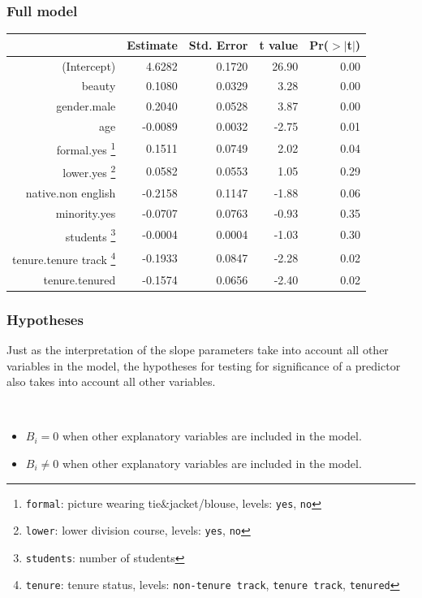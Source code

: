 
\begin{frame}[fragile]
\frametitle{Full model}

{\small
\begin{center}
\begin{tabular}{rrrrr}
  \hline
 & Estimate & Std. Error & t value & Pr($>$$|$t$|$) \\ 
  \hline
(Intercept) & 4.6282 & 0.1720 & 26.90 & 0.00 \\ 
  beauty & 0.1080 & 0.0329 & 3.28 & 0.00 \\ 
  gender.male & 0.2040 & 0.0528 & 3.87 & 0.00 \\ 
  age & -0.0089 & 0.0032 & -2.75 & 0.01 \\ 
formal.yes \footnote{\texttt{formal}: picture wearing tie\&jacket/blouse, levels: \texttt{yes}, \texttt{no}} & 0.1511 & 0.0749 & 2.02 & 0.04 \\ 
  lower.yes \footnote{\texttt{lower}: lower division course, levels: \texttt{yes}, \texttt{no}} & 0.0582 & 0.0553 & 1.05 & 0.29 \\ 
  native.non english & -0.2158 & 0.1147 & -1.88 & 0.06 \\ 
  minority.yes & -0.0707 & 0.0763 & -0.93 & 0.35 \\ 
  students \footnote{\texttt{students}: number of students} & -0.0004 & 0.0004 & -1.03 & 0.30 \\ 
  tenure.tenure track \footnote{\texttt{tenure}: tenure status, levels: \texttt{non-tenure track}, \texttt{tenure track}, \texttt{tenured}} & -0.1933 & 0.0847 & -2.28 & 0.02 \\ 
  tenure.tenured & -0.1574 & 0.0656 & -2.40 & 0.02 \\ 
   \hline
\end{tabular}
\end{center}
}

\end{frame}


\begin{frame}
\frametitle{Hypotheses}

Just as the interpretation of the slope parameters take into account all other variables in the model,  the hypotheses for testing for significance of a predictor also takes into account all other variables.

$\:$ \\

\begin{itemize}
\item[]  $B_i = 0$ when other explanatory variables are included in the model.
\item[]  $B_i \ne 0$ when other explanatory variables are included in the model.
\end{itemize}

\end{frame}

